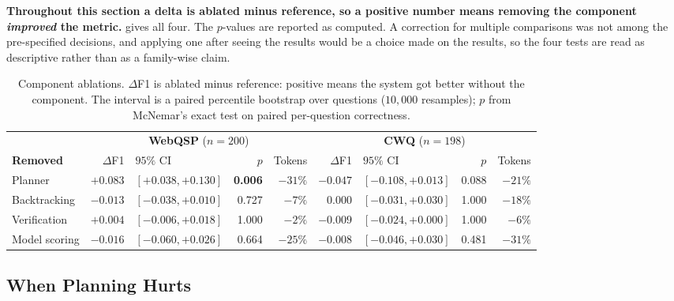 \textbf{Throughout this section a delta is ablated minus reference, so a
positive number means removing the component \emph{improved} the
metric.}  gives all four. The $p$-values are reported
as computed. A correction for multiple comparisons was not among the
pre-specified decisions, and applying one after seeing the results would
be a choice made on the results, so the four tests are read as
descriptive rather than as a family-wise claim.

\begin{table}[!tb]
  \begin{center}
        \caption{Component ablations. $\Delta$F1 is ablated minus reference:
      positive means the system got better without the component. The
      interval is a paired percentile bootstrap over questions
      ($10{,}000$ resamples); $p$ from McNemar's exact test on paired
      per-question correctness.}
    \label{tab:ablation}
    \scriptsize
    \setlength{\tabcolsep}{2.5pt}
    \begin{tabular}{|l|rlrr|rlrr|}
      \hline
      & \multicolumn{4}{c|}{\textbf{WebQSP} ($n=200$)}
      & \multicolumn{4}{c|}{\textbf{CWQ} ($n=198$)} \\
      \textbf{Removed} & $\Delta$F1 & $95\%$ CI & $p$ & Tokens
                       & $\Delta$F1 & $95\%$ CI & $p$ & Tokens \\
      \hline
      Planner        & $+0.083$ & $[+0.038, +0.130]$ & \textbf{0.006} & $-31\%$
                     & $-0.047$ & $[-0.108, +0.013]$ & 0.088 & $-21\%$ \\
      Backtracking   & $-0.013$ & $[-0.038, +0.010]$ & 0.727 & $-7\%$
                     & $0.000$  & $[-0.031, +0.030]$ & 1.000 & $-18\%$ \\
      Verification   & $+0.004$ & $[-0.006, +0.018]$ & 1.000 & $-2\%$
                     & $-0.009$ & $[-0.024, +0.000]$ & 1.000 & $-6\%$ \\
      Model scoring  & $-0.016$ & $[-0.060, +0.026]$ & 0.664 & $-25\%$
                     & $-0.008$ & $[-0.046, +0.030]$ & 0.481 & $-31\%$ \\
      \hline
    \end{tabular}
  \end{center}
\end{table}

\subsection{When Planning Hurts}\label{sec:planner}

